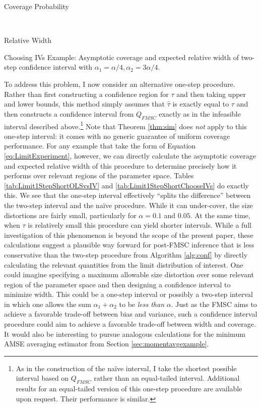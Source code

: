 \begin{table}[h]
  \centering
  \begin{subtable}{0.48\textwidth}
    \caption{Coverage Probability}
    
  \end{subtable}
  ~
  \begin{subtable}{0.48\textwidth}
    \caption{Relative Width}
    
  \end{subtable}
  \caption{Choosing IVs Example: Asymptotic coverage and expected relative width of two-step confidence interval with $\alpha_1 = \alpha/4,  \alpha_2 = 3\alpha/4$.}
  \label{tab:Limit2StepWideTauChooseIVs}
\end{table}

To address this problem, I now consider an alternative one-step procedure.
Rather than first constructing a confidence region for $\tau$ and then taking upper and lower bounds, this method simply assumes that $\widehat{\tau}$ is exactly equal to $\tau$ and then constructs a confidence interval from $Q_{FMSC}$ exactly as in the infeasible interval described above.\footnote{As in the construction of the na\"{i}ve interval, I take the shortest possible interval based on $Q_{FMSC}$ rather than an equal-tailed interval. Additional results for an equal-tailed version of this one-step procedure are available upon request. Their performance is similar.}
Note that Theorem \ref{thm:sim} does \emph{not} apply to this one-step interval: it comes with no generic guarantee of uniform coverage performance.
For any example that take the form of Equation \ref{eq:LimitExperiment}, however, we can directly calculate the asymptotic coverage and expected relative width of this procedure to determine precisely how it performs over relevant regions of the parameter space.
Tables \ref{tab:Limit1StepShortOLSvsIV} and \ref{tab:Limit1StepShortChooseIVs} do exactly this.
We see that the one-step interval effectively ``splits the difference'' between the two-step interval and the na\"{i}ve procedure. 
While it can under-cover, the size distortions are fairly small, particularly for $\alpha=0.1$ and $0.05$.
At the same time, when $\tau$ is relatively small this procedure can yield shorter intervals.
While a full investigation of this phenomenon is beyond the scope of the present paper, these calculations suggest a plausible way forward for post-FMSC inference that is less conservative than the two-step procedure from Algorithm \ref{alg:conf} by directly calculating the relevant quantities from the limit distribution of interest.
One could imagine specifying a maximum allowable size distortion over some relevant region of the parameter space and then designing a confidence interval to minimize width.
This could be a one-step interval or possibly a two-step interval in which one allows the sum $\alpha_1 + \alpha_2$ to be \emph{less than} $\alpha$.
Just as the FMSC aims to achieve a favorable trade-off between bias and variance, such a confidence interval procedure could aim to achieve a favorable trade-off between width and coverage.
It would also be interesting to pursue analogous calculations for the minimum AMSE averaging estimator from Section \ref{sec:momentavgexample}.

